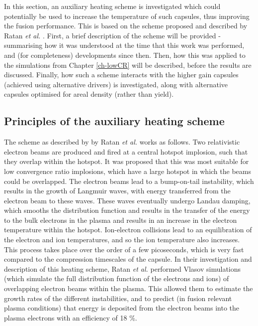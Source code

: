 In this section, an auxiliary heating scheme is investigated which could potentially be used to increase the temperature of such capsules, thus improving the fusion performance. This is based on the scheme proposed and described by Ratan \textit{et al.} \cite{Ratan2017}. First, a brief description of the scheme will be provided - summarising how it was understood at the time that this work was performed, and (for completeness) developments since then. Then, how this was applied to the simulations from Chapter \ref{ch-lowCR} will be described, before the results are discussed. Finally, how such a scheme interacts with the higher gain capsules (achieved using alternative drivers) is investigated, along with alternative capsules optimised for areal density (rather than yield).

\subsection{Principles of the auxiliary heating scheme}

The scheme as described by by Ratan \textit{et al.} \cite{Ratan2017} works as follows. Two relativistic electron beams are produced and fired at a central hotspot implosion, such that they overlap within the hotspot. It was proposed that this was most suitable for low convergence ratio implosions, which have a large hotspot in which the beams could be overlapped. The electron beams lead to a bump-on-tail instability, which results in the growth of Langmuir waves, with energy transferred from the electron beam to these waves. These waves eventually undergo Landau damping, which smooths the distribution function and results in the transfer of the energy to the bulk electrons in the plasma and results in an increase in the electron temperature within the hotspot. Ion-electron collisions lead to an equilibration of the electron and ion temperatures, and so the ion temperature also increases. This process takes place over the order of a few picoseconds, which is very fast compared to the compression timescales of the capsule. In their investigation and description of this heating scheme, Ratan \textit{et al.} performed Vlasov simulations (which simulate the full distribution function of the electrons and ions) of overlapping electron beams within the plasma. This allowed them to estimate the growth rates of the different instabilities, and to predict (in fusion relevant plasma conditions) that energy is deposited from the electron beams into the plasma electrons with an efficiency of 18 \%.


